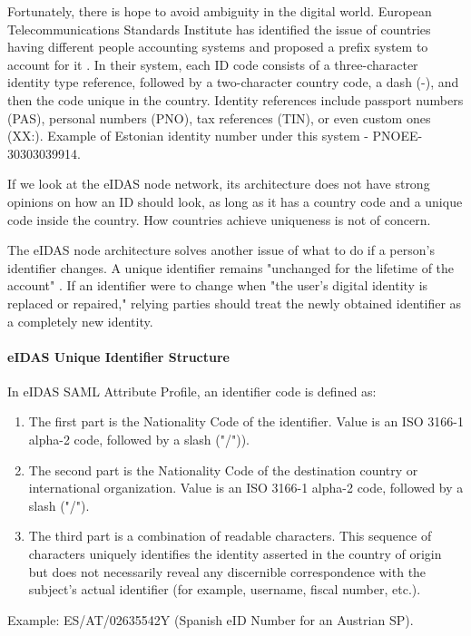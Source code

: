 Fortunately, there is hope to avoid ambiguity in the digital world. European Telecommunications Standards Institute has identified the issue of countries having different people accounting systems and proposed a prefix system to account for it \cite{etsi-pno-numbering}. In their system, each ID code consists of a three-character identity type reference, followed by a two-character country code, a dash (-), and then the code unique in the country. Identity references include passport numbers (PAS), personal numbers (PNO), tax references (TIN), or even custom ones ({XX:}). Example of Estonian identity number under this system - {PNOEE-30303039914}.

If we look at the eIDAS node network, its architecture does not have strong opinions on how an ID should look, as long as it has a country code and a unique code inside the country. How countries achieve uniqueness is not of concern.

The eIDAS node architecture solves another issue of what to do if a person's identifier changes. A unique identifier remains "unchanged for the lifetime of the account" \cite{eidas-saml}. If an identifier were to change when "the user's digital identity is replaced or repaired," relying parties should treat the newly obtained identifier as a completely new identity.

\paragraph{eIDAS Unique Identifier Structure} In eIDAS SAML Attribute Profile, an identifier code is defined as:
\begin{enumerate}
  \item The first part is the Nationality Code of the identifier. Value is an ISO 3166-1 alpha-2 code, followed by a slash ("/")).
  \item The second part is the Nationality Code of the destination country or international organization. Value is an ISO 3166-1 alpha-2 code, followed by a slash ("/").
  \item The third part is a combination of readable characters. This sequence of characters uniquely identifies the identity asserted in the country of origin but does not necessarily reveal any discernible correspondence with the subject's actual identifier (for example, username, fiscal number, etc.).
\end{enumerate}

Example: ES/AT/02635542Y (Spanish eID Number for an Austrian SP).

